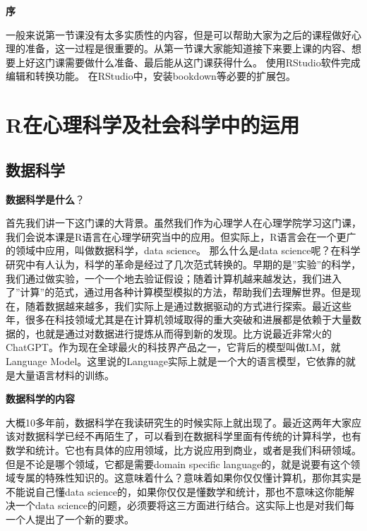 \documentclass[
  oneside]{book}
\begin{document}
\textbf{序}

一般来说第一节课没有太多实质性的内容，但是可以帮助大家为之后的课程做好心理的准备，这一过程是很重要的。从第一节课大家能知道接下来要上课的内容、想要上好这门课需要做什么准备、最后能从这门课获得什么。
使用RStudio软件完成编辑和转换功能。
在RStudio中，安装bookdown等必要的扩展包。

\hypertarget{rux5728ux5fc3ux7406ux79d1ux5b66ux53caux793eux4f1aux79d1ux5b66ux4e2dux7684ux8fd0ux7528}{%
\section{R在心理科学及社会科学中的运用}\label{rux5728ux5fc3ux7406ux79d1ux5b66ux53caux793eux4f1aux79d1ux5b66ux4e2dux7684ux8fd0ux7528}}

\hypertarget{1-data-science}{%
\subsection{数据科学}\label{1-data-science}}

\textbf{数据科学是什么}？

首先我们讲一下这门课的大背景。虽然我们作为心理学人在心理学院学习这门课，我们会说本课是R语言在心理学研究当中的应用。但实际上，R语言会在一个更广的领域中应用，叫做数据科学，data science。 那么什么是data science呢？在科学研究中有人认为，科学的革命是经过了几次范式转换的。早期的是''实验''的科学，我们通过做实验，一个一个地去验证假设；随着计算机越来越发达，我们进入了''计算''的范式，通过用各种计算模型模拟的方法，帮助我们去理解世界。但是现在，随着数据越来越多，我们实际上是通过数据驱动的方式进行探索。最近这些年，很多在科技领域尤其是在计算机领域取得的重大突破和进展都是依赖于大量数据的，也就是通过对数据进行提炼从而得到新的发现。比方说最近非常火的ChatGPT。作为现在全球最火的科技界产品之一，它背后的模型叫做LM，就Language Model。这里说的Language实际上就是一个大的语言模型，它依靠的就是大量语言材料的训练。

\textbf{数据科学的内容}

大概10多年前，数据科学在我读研究生的时候实际上就出现了。最近这两年大家应该对数据科学已经不再陌生了，可以看到在数据科学里面有传统的计算科学，也有数学和统计。它也有具体的应用领域，比方说应用到商业，或者是我们科研领域。但是不论是哪个领域，它都是需要domain specific language的，就是说要有这个领域专属的特殊性知识的。这意味着什么？意味着如果你仅仅懂计算机，那你其实是不能说自己懂data science的，如果你仅仅是懂数学和统计，那也不意味这你能解决一个data science的问题，必须要将这三方面进行结合。这实际上也是对我们每一个人提出了一个新的要求。
\end{document}
